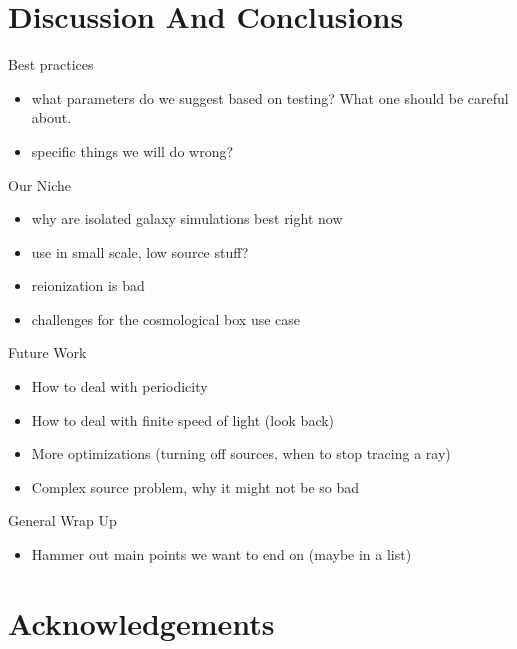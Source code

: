 \documentclass[fleq,usenatbib]{mnras}
\begin{document}
\section{Discussion And Conclusions}\label{sec:disc}

\noindent Best practices
\begin{itemize}
\item what parameters do we suggest based on testing? What one should be 
careful about.
\item specific things we will do wrong?
\end{itemize}

\noindent Our Niche
\begin{itemize}
\item why are isolated galaxy simulations best right now
\item use in small scale, low source stuff?
\item reionization is bad
\item challenges for the cosmological box use case 
\end{itemize}

\noindent Future Work
\begin{itemize}
\item How to deal with periodicity
\item How to deal with finite speed of light (look back)
\item More optimizations (turning off sources, when to stop tracing a ray)
\item Complex source problem, why it might not be so bad
\end{itemize}

\noindent General Wrap Up
\begin{itemize}
\item Hammer out main points we want to end on (maybe in a list)
\end{itemize}

\section*{Acknowledgements}\label{sec:ackn}







\end{document}
